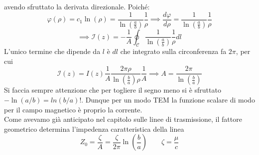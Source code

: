 \documentclass{book}
\begin{document}
        avendo sfruttato la derivata direzionale. Poiché: 
        \begin{equation}
            \varphi(\rho) = c_{1} \ln(\rho) = \frac{1}{\ln(\frac{a}{b})}\frac{1}{\rho} \implies \frac{d \varphi}{d \rho} = \frac{1}{\ln(\frac{a}{b})}\frac{1}{\rho}
        \end{equation}
        \begin{equation}
            \implies \mathcal{I}(z) = -\frac{1}{A} \oint_{\mathcal{C}} \frac{1}{\ln(\frac{a}{b})}\frac{1}{\rho} dl        \end{equation}
        L'unico termine che dipende da $l$ è $dl$ che integrato sulla circonferenza fa $2\pi$, per cui
        \begin{equation}
            \mathcal{I}(z) = I(z) \frac{1}{A} \frac{2 \pi \rho}{\ln(\frac{b}{a}) \rho} \frac{1}{A} \implies A = \frac{2\pi}{\ln(\frac{b}{a})}
        \end{equation}
        Si faccia sempre attenzione che per togliere il segno meno si è sfruttato $-\ln(a/b) = ln(b/a)$!. Dunque per un modo TEM la funzione scalare di modo 
        per il campo magnetico è proprio la corrente. \\
        Come avevamo già anticipato nel capitolo sulle linee di trasmissione, il fattore geometrico determina l'impedenza 
        caratteristica della linea 
        \begin{equation}
            Z_{0} = \frac{\zeta}{A} = \frac{\zeta}{2 \pi} \ln (\frac{b}{a}) \qquad \zeta = \frac{\mu}{c}
        \end{equation}
\end{document}
